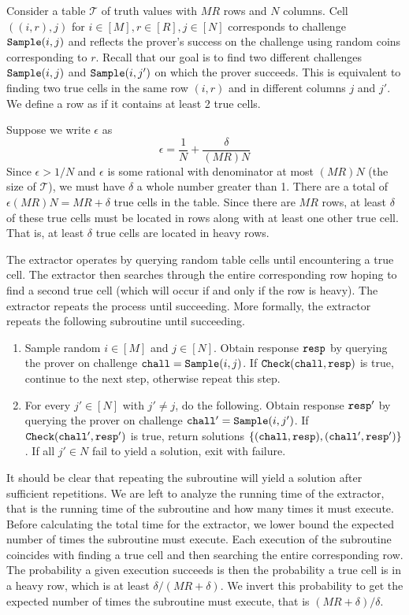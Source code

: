 Consider a table $\mathcal{T}$ of truth values with $MR$ rows and $N$ columns.
Cell $((i,r),j)$ for $i\in[M], r\in[R], j\in[N]$ corresponds to challenge $\mathtt{Sample}(i,j)$ and reflects the prover's success on the challenge using random coins corresponding to $r$.
Recall that our goal is to find two different challenges $\mathtt{Sample}(i,j)$ and $\mathtt{Sample}(i,j')$ on which the prover succeeds.
This is equivalent to finding two true cells in the same row $(i,r)$ and in different columns $j$ and $j'$.
We define a row as  if it contains at least 2 true cells.

Suppose we write $\epsilon$ as
\begin{equation}
    \epsilon = \frac{1}{N} + \frac{\delta}{(MR)N}
\end{equation}
Since $\epsilon > 1/N$ and $\epsilon$ is some rational with denominator at most $(MR)N$ (the size of $\mathcal{T}$), we must have $\delta$ a whole number greater than 1.
There are a total of $\epsilon (MR)N = MR + \delta$ true cells in the table.
Since there are $MR$ rows, at least $\delta$ of these true cells must be located in rows along with at least one other true cell.
That is, at least $\delta$ true cells are located in heavy rows.

The extractor operates by querying random table cells until encountering a true cell.
The extractor then searches through the entire corresponding row hoping to find a second true cell (which will occur if and only if the row is heavy).
The extractor repeats the process until succeeding.
More formally, the extractor repeats the following subroutine until succeeding.
\begin{enumerate}
    \item
    Sample random $i\in[M]$ and $j\in[N]$.
    Obtain response $\mathtt{resp}$ by querying the prover on challenge $\mathtt{chall}=\mathtt{Sample}(i,j)$.
    If $\mathtt{Check}(\mathtt{chall},\mathtt{resp})$ is true, continue to the next step, otherwise repeat this step.

    \item
    For every $j'\in[N]$ with $j'\neq j$, do the following.
    Obtain response $\mathtt{resp}'$ by querying the prover on challenge $\mathtt{chall}'=\mathtt{Sample}(i,j')$.
    If $\mathtt{Check}(\mathtt{chall}',\mathtt{resp}')$ is true, return solutions $\{(\mathtt{chall},\mathtt{resp}),(\mathtt{chall}',\mathtt{resp}')\}$.
    If all $j'\in N$ fail to yield a solution, exit with failure.
\end{enumerate}

It should be clear that repeating the subroutine will yield a solution after sufficient repetitions.
We are left to analyze the running time of the extractor, that is the running time of the subroutine and how many times it must execute.
Before calculating the total time for the extractor, we lower bound the expected number of times the subroutine must execute.
Each execution of the subroutine coincides with finding a true cell and then searching the entire corresponding row.
The probability a given execution succeeds is then the probability a true cell is in a heavy row, which is at least $\delta/(MR+\delta)$.
We invert this probability to get the expected number of times the subroutine must execute, that is $(MR+\delta)/\delta$.

